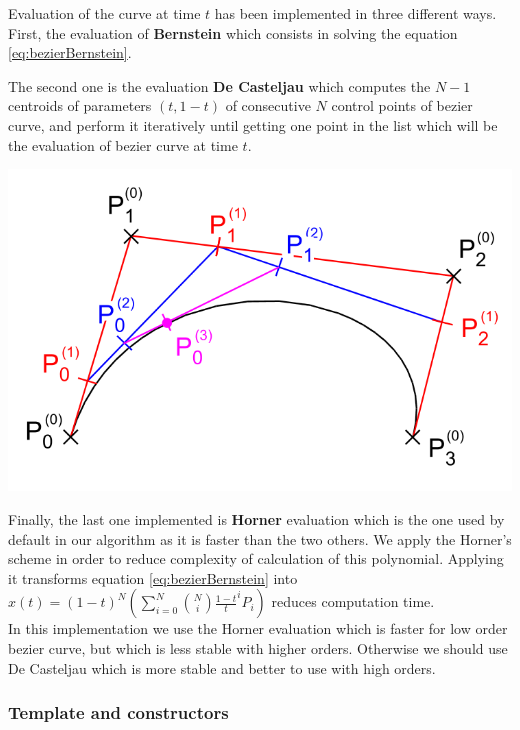 \documentclass{article}
\begin{document}
    Evaluation of the curve at time $t$ has been implemented in three different ways.
    First, the evaluation of \textbf{Bernstein} which consists in solving the equation \eqref{eq:bezierBernstein}. 
    
    The second one is the evaluation \textbf{De Casteljau} which computes the $N-1$ centroids of parameters $(t,1-t)$ of consecutive $N$ control points of bezier curve, and perform it iteratively until getting one point in the list which will be the evaluation of bezier curve at time $t$.
    \begin{center}
        \includegraphics[width=\textwidth]{images/De_Casteljau_construction.png}
    \end{center}
    
    Finally, the last one implemented is  \textbf{Horner} evaluation which is the one used by default in our algorithm as it is faster than the two others. We apply the Horner's scheme in order to reduce complexity of calculation of this polynomial. Applying it transforms equation \eqref{eq:bezierBernstein} into $ x(t) = (1-t)^N(\sum_{i=0}^{N} \binom{N}{i} \frac{1-t}{t}^i P_i)$ reduces computation time.\\
    
    In this implementation we use the Horner evaluation which is faster for low order bezier curve, but which is less stable with higher orders. Otherwise we should use De Casteljau which is more stable and better to use with high orders.\\
    
    \subsubsection{Template and constructors}
    
\end{document}
